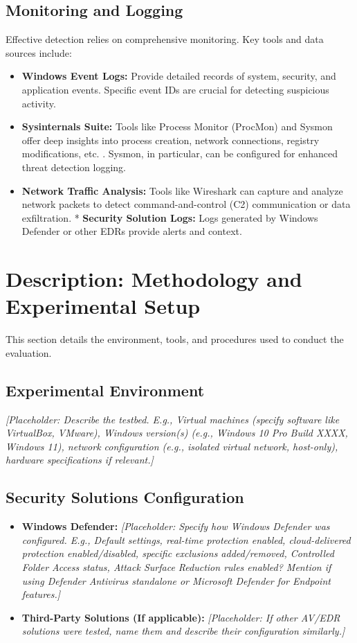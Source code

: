 \documentclass{ULBreport}
\begin{document}
\subsection{Monitoring and Logging}
Effective detection relies on comprehensive monitoring. Key tools and data sources include:
\begin{itemize}
	\item \textbf{Windows Event Logs:} Provide detailed records of system, security, and application events. Specific event IDs are crucial for detecting suspicious activity.
	\item \textbf{Sysinternals Suite:} Tools like Process Monitor (ProcMon) and Sysmon offer deep insights into process creation, network connections, registry modifications, etc. \cite{sysinternals}. Sysmon, in particular, can be configured for enhanced threat detection logging.
	\item \textbf{Network Traffic Analysis:} Tools like Wireshark can capture and analyze network packets to detect command-and-control (C2) communication or data exfiltration.
	* \textbf{Security Solution Logs:} Logs generated by Windows Defender \cite{defender_endpoint} or other EDRs \cite{elastic_security} provide alerts and context.
\end{itemize}

\section*{Description: Methodology and Experimental Setup}
This section details the environment, tools, and procedures used to conduct the evaluation.

\subsection{Experimental Environment}
\textit{[Placeholder: Describe the testbed. E.g., Virtual machines (specify software like VirtualBox, VMware), Windows version(s) (e.g., Windows 10 Pro Build XXXX, Windows 11), network configuration (e.g., isolated virtual network, host-only), hardware specifications if relevant.]}

\subsection{Security Solutions Configuration}
\begin{itemize}
	\item \textbf{Windows Defender:} \textit{[Placeholder: Specify how Windows Defender was configured. E.g., Default settings, real-time protection enabled, cloud-delivered protection enabled/disabled, specific exclusions added/removed, Controlled Folder Access status, Attack Surface Reduction rules enabled? Mention if using Defender Antivirus standalone or Microsoft Defender for Endpoint features.]}
	\item \textbf{Third-Party Solutions (If applicable):} \textit{[Placeholder: If other AV/EDR solutions were tested, name them and describe their configuration similarly.]}
\end{itemize}
\end{document}
